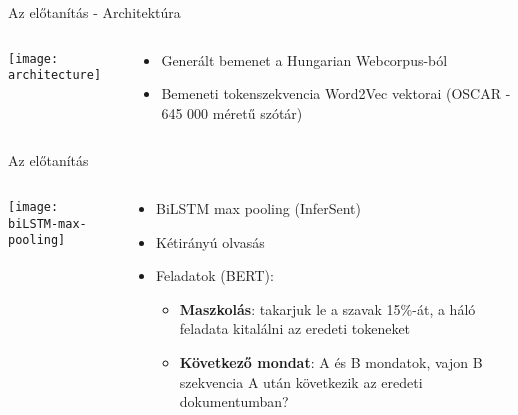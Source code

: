 \documentclass{beamer}
\begin{document}
\begin{frame}{Az előtanítás - Architektúra}
	

\begin{columns}[t]
	\begin{column}{0.3\textwidth}
		\vspace{\topsep}
		
		\texttt{[image: architecture]}%
	\end{column}
	
	\begin{column}{0.5\textwidth}
		\begin{itemize}
			\item Generált bemenet a Hungarian Webcorpus-ból
			\item Bemeneti tokenszekvencia Word2Vec vektorai (OSCAR - 645 000 méretű szótár)
		\end{itemize}
	\end{column}
\end{columns}
	
\end{frame}

\begin{frame}{Az előtanítás}
	
\begin{columns}[t]
	\begin{column}{0.4\textwidth}
		\vspace{\topsep}
		
		\texttt{[image: biLSTM-max-pooling]}%
	\end{column}
	
	\begin{column}{0.6\textwidth}
		\begin{itemize}
			\item BiLSTM max pooling (InferSent)
			\item Kétirányú olvasás
			\item Feladatok (BERT):
			\begin{itemize}
				\item \textbf{Maszkolás}: takarjuk le a szavak 15\%-át, a háló feladata kitalálni az eredeti tokeneket
				\item \textbf{Következő mondat}: A és B mondatok, vajon B szekvencia A után következik az eredeti dokumentumban?
			\end{itemize}
		\end{itemize}
	\end{column}
\end{columns}
	
\end{frame}
\end{document}
